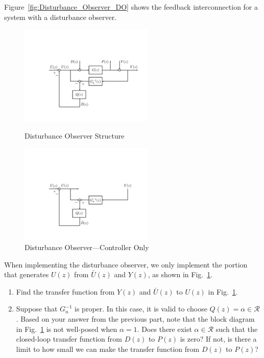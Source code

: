 \item
Figure~\ref{fig:Disturbance_Observer_DO} shows the feedback interconnection for a system with a disturbance observer.
\begin{figure}[h]
    \centering
    \begin{minipage}{2.5in}
        \includegraphics[width=2.5in]{Disturbance_Observer_DO}
        \caption{Disturbance Observer Structure}
        \label{fig:Disturbance_Observer_DO}
    \end{minipage}
    \qquad
    \begin{minipage}{2.5in}
        \includegraphics[width=2.5in]{Disturbance_Observer_controller}
        \caption{Disturbance Observer---Controller Only}
        \label{fig:Disturbance_Observer_controller}
    \end{minipage}
\end{figure}
When implementing the disturbance observer, we only implement the portion that generates $U(z)$ from $\bar{U}(z)$ and $Y(z)$, as shown in Fig.~\ref{fig:Disturbance_Observer_controller}.

\begin{enumerate}
    \item
    Find the transfer function from $Y(z)$ and $\bar{U}(z)$ to $U(z)$ in Fig.~\ref{fig:Disturbance_Observer_controller}.

    \item
    Suppose that $G_n^{-1}$ is proper. In this case, it is valid to choose $Q(z) = \alpha \in \mathcal{R}$. Based on your answer from the previous part, note that the block diagram in Fig.~\ref{fig:Disturbance_Observer_controller} is not well-posed when $\alpha = 1$. Does there exist $\alpha \in \mathcal{R}$ such that the closed-loop transfer function from $D(z)$ to $P(z)$ is zero? If not, is there a limit to how small we can make the transfer function from $D(z)$ to $P(z)$?

\end{enumerate}


